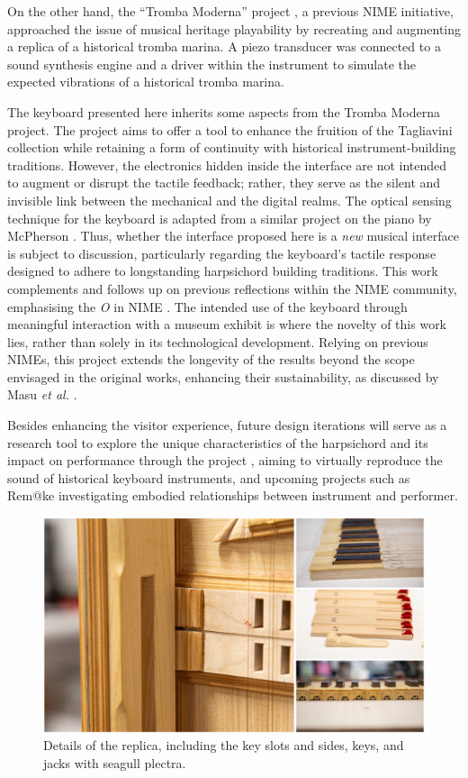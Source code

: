 On the other hand, the ``Tromba Moderna'' project \cite{Baldwin2016}, a previous NIME initiative, approached the issue of musical heritage playability by recreating and augmenting a replica of a historical tromba marina. A piezo transducer was connected to a sound synthesis engine and a driver within the instrument to simulate the expected vibrations of a historical tromba marina. 


The keyboard presented here inherits some aspects from the Tromba Moderna project. The project aims to offer a tool to enhance the fruition of the Tagliavini collection while retaining a form of continuity with historical instrument-building traditions. However, the electronics hidden inside the interface are not intended to augment or disrupt the tactile feedback; rather, they serve as the silent and invisible link between the mechanical and the digital realms. 
The optical sensing technique for the keyboard is adapted from a similar project on the piano by McPherson \cite{McPherson2013}. 
Thus, whether the interface proposed here is a \emph{new} musical interface is subject to discussion, particularly regarding the keyboard's tactile response designed to adhere to longstanding harpsichord building traditions. This work complements and follows up on previous reflections within the NIME community, emphasising the \emph{O} in NIME \cite{Masu_NIME_2023}. The intended use of the keyboard through meaningful interaction with a museum exhibit is where the novelty of this work lies, rather than solely in its technological development. Relying on previous NIMEs, this project extends the longevity of the results beyond the scope envisaged in the original works, enhancing their sustainability, as discussed by Masu \emph{et al.} \cite{Masu_NIME_2023}.

Besides enhancing the visitor experience, future design iterations will serve as a research tool to explore the unique characteristics of the harpsichord and its impact on performance through the  project , aiming to virtually reproduce the sound of historical keyboard instruments, and upcoming projects such as Rem@ke \cite{remake1} investigating embodied relationships between instrument and performer.

\begin{figure}
\centering
\includegraphics[width=0.8\linewidth]{src/images/details.jpg}
\caption{Details of the replica, including the key slots and sides, keys, and jacks with seagull plectra.}\label{fig:details}
\end{figure}

